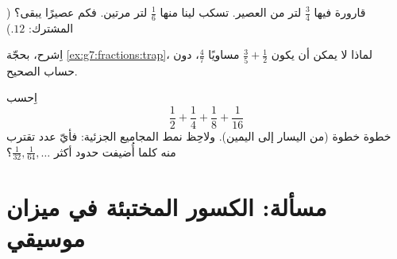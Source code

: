 \begin{exercise}[$\star\star$]\label{exo:g7:fractions:10}
قارورة فيها $\frac34$ لتر من العصير. تسكب لينا منها $\frac16$ لتر
مرتين. فكم عصيرًا يبقى؟ ( المشترك: $12$.)
\end{exercise}

\begin{exercise}[$\star\star$]\label{exo:g7:fractions:11}
اِشرح، بحجّة \cref{ex:g7:fractions:trap}، لماذا لا يمكن أن يكون
$\frac35 + \frac12$ مساويًا $\frac{4}{7}$، دون حساب
 الصحيح.
\end{exercise}

\begin{exercise}[$\star\star\star$]\label{exo:g7:fractions:12}
اِحسب 
\[
\frac12 + \frac14 + \frac18 + \frac{1}{16}
\]
خطوة خطوة (من اليسار إلى اليمين). ولاحِظ نمط المجاميع الجزئية:
فأيّ عدد تقترب منه كلما أُضيفت حدود أكثر
$\frac{1}{32}, \frac{1}{64}, \dots$؟
\end{exercise}

\section{مسألة: الكسور المختبئة في ميزان موسيقي}

